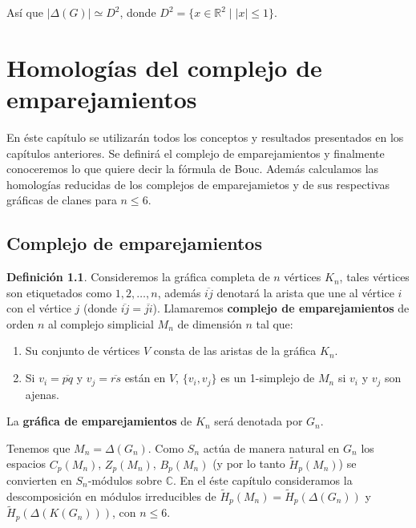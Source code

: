 \documentclass[12pt]{book}
\theoremstyle{definition}
\newtheorem{definition}[theorem]{Definición}
\newcounter{in}
\newcounter{ini}
\begin{document}
Así que $|\Delta(G)|\simeq D^{2}$, donde $D^{2}=\{x\in\mathbb{R}^{2}
\mid |x|\leq 1\}$. 

\chapter{Homologías del complejo de emparejamientos}
\label{cha:hom-com-emp}

En éste capítulo se utilizarán todos los conceptos y resultados
presentados en los capítulos anteriores. Se definirá el complejo de
emparejamientos y finalmente conoceremos lo que quiere decir la
fórmula de Bouc. Además calculamos las homologías reducidas de los
complejos de emparejamietos y de sus respectivas gráficas de clanes para
$n\leq 6$.

\section{Complejo de emparejamientos}
\label{complejo-emparejamientos}
\begin{definition}
Consideremos la gráfica completa de $n$ vértices $K_{n}$, tales
vértices son etiquetados como $1,2,\ldots,n$, además
$\overline{ij}$ denotará la arista que une al vértice $i$ con el
vértice $j$ (donde $\overline{ij}=\overline{ji}$). Llamaremos \textbf{complejo de emparejamientos} de orden
$n$ al complejo simplicial $M_{n}$ de dimensión $n$ tal que:

\begin{enumerate}
  \item Su conjunto de vértices $V$ consta de las aristas de la gráfica
  $K_{n}$. 

  \item Si $v_{i}=\overline{pq}$ y $v_{j}=\overline{rs}$ están en
  $V$, $\{v_{i},v_{j}\}$ es  un 1-simplejo de $M_{n}$ si $v_{i}$
  y $v_{j}$ son ajenas.
\end{enumerate} 
La \textbf{gráfica de emparejamientos} de $K_{n}$ será denotada por $G_{n}$.
\end{definition}

Tenemos que $M_{n}=\Delta(G_{n})$. Como $S_{n}$ actúa de manera
natural en $G_{n}$ los espacios $C_{p}(M_{n})$, $Z_{p}(M_{n})$,
$B_{p}(M_{n})$ (y por lo tanto $\widetilde H_{p}(M_{n})$) se convierten en
$S_{n}$-módulos sobre $\mathbb{C}$. En el éste capítulo consideramos
la descomposición en módulos irreducibles de
$\widetilde H_{p}(M_{n})=\widetilde H_{p}(\Delta(G_{n}))$ y
$\widetilde H_{p}(\Delta(K(G_{n})))$, con $n\leq 6$.
\end{document}

